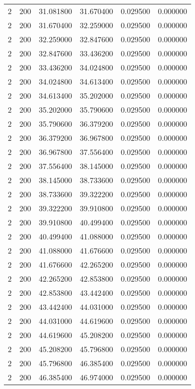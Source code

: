 \begin{longtable}{rrrrrr}
2 & 200 & 31.081800 & 31.670400 & 0.029500 & 0.000000 \\
2 & 200 & 31.670400 & 32.259000 & 0.029500 & 0.000000 \\
2 & 200 & 32.259000 & 32.847600 & 0.029500 & 0.000000 \\
2 & 200 & 32.847600 & 33.436200 & 0.029500 & 0.000000 \\
2 & 200 & 33.436200 & 34.024800 & 0.029500 & 0.000000 \\
2 & 200 & 34.024800 & 34.613400 & 0.029500 & 0.000000 \\
2 & 200 & 34.613400 & 35.202000 & 0.029500 & 0.000000 \\
2 & 200 & 35.202000 & 35.790600 & 0.029500 & 0.000000 \\
2 & 200 & 35.790600 & 36.379200 & 0.029500 & 0.000000 \\
2 & 200 & 36.379200 & 36.967800 & 0.029500 & 0.000000 \\
2 & 200 & 36.967800 & 37.556400 & 0.029500 & 0.000000 \\
2 & 200 & 37.556400 & 38.145000 & 0.029500 & 0.000000 \\
2 & 200 & 38.145000 & 38.733600 & 0.029500 & 0.000000 \\
2 & 200 & 38.733600 & 39.322200 & 0.029500 & 0.000000 \\
2 & 200 & 39.322200 & 39.910800 & 0.029500 & 0.000000 \\
2 & 200 & 39.910800 & 40.499400 & 0.029500 & 0.000000 \\
2 & 200 & 40.499400 & 41.088000 & 0.029500 & 0.000000 \\
2 & 200 & 41.088000 & 41.676600 & 0.029500 & 0.000000 \\
2 & 200 & 41.676600 & 42.265200 & 0.029500 & 0.000000 \\
2 & 200 & 42.265200 & 42.853800 & 0.029500 & 0.000000 \\
2 & 200 & 42.853800 & 43.442400 & 0.029500 & 0.000000 \\
2 & 200 & 43.442400 & 44.031000 & 0.029500 & 0.000000 \\
2 & 200 & 44.031000 & 44.619600 & 0.029500 & 0.000000 \\
2 & 200 & 44.619600 & 45.208200 & 0.029500 & 0.000000 \\
2 & 200 & 45.208200 & 45.796800 & 0.029500 & 0.000000 \\
2 & 200 & 45.796800 & 46.385400 & 0.029500 & 0.000000 \\
2 & 200 & 46.385400 & 46.974000 & 0.029500 & 0.000000 \\

\end{longtable}
